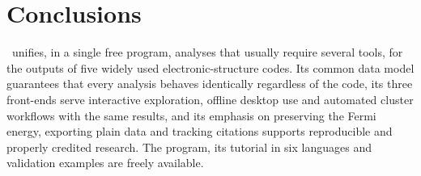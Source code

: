 \section{Conclusions}
\BMR\ unifies, in a single free program, analyses that usually require several tools, for the outputs of five widely used electronic-structure codes. Its common data model guarantees that every analysis behaves identically regardless of the code, its three front-ends serve interactive exploration, offline desktop use and automated cluster workflows with the same results, and its emphasis on preserving the Fermi energy, exporting plain data and tracking citations supports reproducible and properly credited research. The program, its tutorial in six languages and validation examples are freely available.
